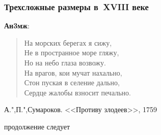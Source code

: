 \documentclass{beamer}
\begin{document}



\begin{frame}
\frametitle{Трехсложные размеры в~XVIII веке}

\textbf{Ан3мж}:
\begin{verse}
На морских берегах я сижу,\\ 
Не в пространное море гляжу,\\ 
Но на небо глаза возвожу. \\
На врагов, кои мучат нахально,\\ 
Стон пуская в селение дально, \\
Сердце жалобы взносит печально. 
\end{verse}
А.",П.",Сумароков. <<Противу злодеев>>, 1759

\end{frame}




\begin{frame}
\Huge{\centerline{продолжение следует}}
\end{frame}
\end{document}
